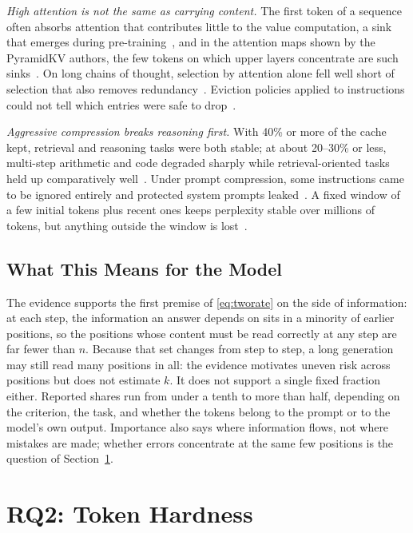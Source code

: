 \documentclass{ieeeaccess}
\begin{document}
\emph{High attention is not the same as carrying content.} The first token of a sequence often absorbs attention that contributes little to the value computation, a sink that emerges during pre-training~\cite{gu2025sink}, and in the attention maps shown by the PyramidKV authors, the few tokens on which upper layers concentrate are such sinks~\cite{cai2024pyramidkv}. On long chains of thought, selection by attention alone fell well short of selection that also removes redundancy~\cite{cai2025rkv}. Eviction policies applied to instructions could not tell which entries were safe to drop~\cite{chen2026pitfalls}.

\emph{Aggressive compression breaks reasoning first.} With 40\% or more of the cache kept, retrieval and reasoning tasks were both stable; at about 20--30\% or less, multi-step arithmetic and code degraded sharply while retrieval-oriented tasks held up comparatively well~\cite{liu2026semantic}. Under prompt compression, some instructions came to be ignored entirely and protected system prompts leaked~\cite{chen2026pitfalls}. A fixed window of a few initial tokens plus recent ones keeps perplexity stable over millions of tokens, but anything outside the window is lost~\cite{xiao2024streamingllm}.

\subsection{What This Means for the Model}
The evidence supports the first premise of \eqref{eq:tworate} on the side of information: at each step, the information an answer depends on sits in a minority of earlier positions, so the positions whose content must be read correctly at any step are far fewer than $n$. Because that set changes from step to step, a long generation may still read many positions in all: the evidence motivates uneven risk across positions but does not estimate $k$. It does not support a single fixed fraction either. Reported shares run from under a tenth to more than half, depending on the criterion, the task, and whether the tokens belong to the prompt or to the model's own output. Importance also says where information flows, not where mistakes are made; whether errors concentrate at the same few positions is the question of Section~\ref{sec:hardness}.

\section{RQ2: Token Hardness}
\label{sec:hardness}
\end{document}
